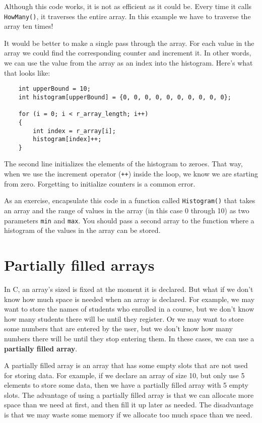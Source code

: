 Although this code works, it is not as efficient as it could
be.  Every time it calls {\tt HowMany()}, it traverses the
entire array.  In this example we have to traverse the
array ten times!

It would be better to make a single pass through the array.
For each value in the array we could find the corresponding
counter and increment it.  In other words, we can use the
value from the array as an index into the histogram.  Here's
what that looks like:

\begin{verbatim}
    int upperBound = 10;
    int histogram[upperBound] = {0, 0, 0, 0, 0, 0, 0, 0, 0, 0};

    for (i = 0; i < r_array_length; i++) 
    {
        int index = r_array[i];
        histogram[index]++;
    }
\end{verbatim}
%
The second line initializes the elements of the histogram to
zeroes.  That way, when we use the increment
operator ({\tt ++}) inside the loop, we know we are starting from zero.
Forgetting to initialize counters is a common error.

As an exercise, encapsulate this code in a function called {\tt Histogram()} 
that takes an array and the range of values in the array
(in this case 0 through 10) as two parameters \texttt{min} and \texttt{max}. 
You should pass a second array to the function where a histogram of the
values in the array can be stored.


\section{Partially filled arrays}
In C, an array's sized is fixed at the moment it is declared. But what if we don't know how much space is needed when an array is declared. For example, we may want to store the names of students who enrolled in a course, but we don't know how many students there will be until they register. Or we may want to store some numbers that are entered by the user, but we don't know how many numbers there will be until they stop entering them. In these cases, we can use a {\bf partially filled array}.

A partially filled array is an array that has some empty slots that are not used for storing data. For example, if we declare an array of size 10, but only use 5 elements to store some data, then we have a partially filled array with 5 empty slots. The advantage of using a partially filled array is that we can allocate more space than we need at first, and then fill it up later as needed. The disadvantage is that we may waste some memory if we allocate too much space than we need.

